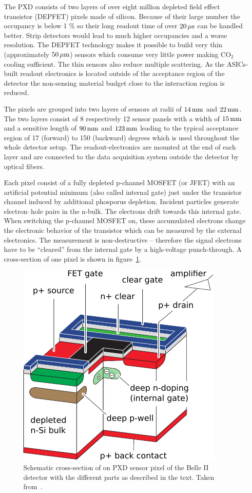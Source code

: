 The PXD consists of two layers of over eight million depleted field effect transistor (DEPFET) pixels made of silicon. Because of their large number the occupancy is below 1 \% so their long readout time of over $\unit[20]{\mu s}$ can be handled better. Strip detectors would lead to much higher occupancies and a worse resolution.
The DEPFET technology makes it possible to build very thin (approximately $\unit[50]{\mu m}$) sensors which consume very little power making $\mathrm{CO}_2$ cooling sufficient. The thin sensors also reduce multiple scattering. As the ASICs-built readout electronics is located outside of the acceptance region of the detector the non-sensing material budget close to the interaction region is reduced.

The pixels are grouped into two layers of sensors at radii of $\unit[14]{mm}$ and $\unit[22]{mm}$. The two layers consist of 8 respectively 12 sensor panels with a width of $\unit[15]{mm}$ and a sensitive length of $\unit[90]{mm}$ and $\unit[123]{mm}$ leading to the typical acceptance region of 17 (forward) to 150 (backward) degrees which is used throughout the whole detector setup. The readout-electronics are mounted at the end of each layer and are connected to the data acquisition system outside the detector by optical fibers.

Each pixel consist of a fully depleted p-channel MOSFET (or JFET) with an artificial potential minimum (also called internal gate) just under the transistor channel induced by additional phosporus depletion. Incident particles generate electron--hole pairs in the n-bulk. The electrons drift towards this internal gate. When switching the p-channel MOSFET on, these accumulated electrons change the electronic behavior of the transistor which can be measured by the external electronics. The measurement is non-destructive -- therefore the signal electrons have to be ``cleared'' from the internal gate by a high-voltage punch-through. A cross-section of one pixel is shown in figure~\ref{fig-pxd-schema}.

\begin{figure}
  \centering
  \includegraphics[width=0.6\linewidth]{figures/experimental_setup/pxd.pdf}
  \caption[Cross-section of a PXD sensor]{Schematic cross-section of on PXD sensor pixel of the Belle II detector with the different parts as described in the text. Taken from~\cite{tdr}.}
  \label{fig-pxd-schema}
\end{figure}


